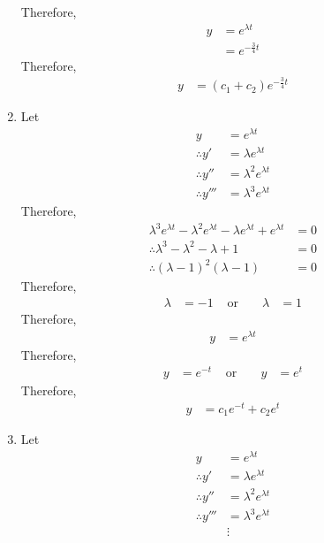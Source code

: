 \documentclass[fleqn, a4paper, 11pt, oneside]{amsart}
\theoremstyle{definition}
\theoremstyle{theorem}
\begin{document}
\begin{solution}
\begin{enumerate}[leftmargin = *]
			Therefore,
			\begin{align*}
				y & = e^{\lambda t} \\
                                  & = e^{-\frac{3}{4} t}
			\end{align*}
			Therefore,
			\begin{align*}
				y &= (c_1 + c_2) e^{-\frac{3}{4} t}
			\end{align*}
		\item
			Let
			\begin{align*}
				y               & = e^{\lambda t}           \\
				\therefore y'   & = \lambda e^{\lambda t}   \\
				\therefore y''  & = \lambda^2 e^{\lambda t} \\
				\therefore y''' & = \lambda^3 e^{\lambda t}
			\end{align*}
			Therefore,
			\begin{align*}
				\lambda^3 e^{\lambda t} - \lambda^2 e^{\lambda t} - \lambda e^{\lambda t} + e^{\lambda t} & = 0 \\
				\therefore \lambda^3 - \lambda^2 - \lambda + 1                                            & = 0 \\
				\therefore (\lambda - 1)^2 (\lambda - 1)                                                  & = 0
			\end{align*}
			Therefore,
			\begin{align*}
				\lambda & = -1 & \text{ or } &  & \lambda & = 1
			\end{align*}
			Therefore,
			\begin{align*}
				y & = e^{\lambda t}
			\end{align*}
			Therefore,
			\begin{align*}
				y & = e^{-t} & \text{ or } &  & y & = e^{t}
			\end{align*}
			Therefore,
			\begin{align*}
				y &= c_1 e^{-t} + c_2 e^t
			\end{align*}
		\item
			Let
			\begin{align*}
				y                  & = e^{\lambda t}           \\
				\therefore y'      & = \lambda e^{\lambda t}   \\
				\therefore y''     & = \lambda^2 e^{\lambda t} \\
				\therefore y'''    & = \lambda^3 e^{\lambda t} \\
                                                   & \vdots                    \\

\end{align*}
\end{enumerate}
\end{solution}
\end{document}
